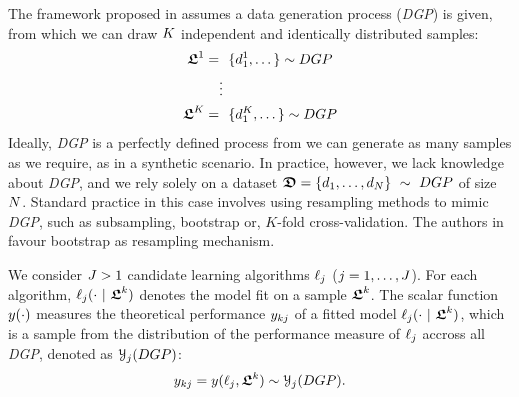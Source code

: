 The framework proposed in \citet{Hothorn2005DABenchExp} assumes
a data generation process (\emph{DGP}) is given,
from which we can draw $K$ independent and identically distributed
samples:
%
\begin{align}
  \begin{split}
    \boldsymbol{\mathfrak{L}}^1 =&{}~\ \{d_1^1, \dots\}
      \sim DGP \\
    &{}\vdots \\
    \boldsymbol{\mathfrak{L}}^{K} =&{}~\ \{d_1^{K},\dots\} 
      \sim DGP
\end{split}
\end{align}
%
Ideally, \emph{DGP} is a perfectly defined process from we can generate
as many samples as we require, as in a synthetic scenario.
%
In practice, however, we lack knowledge about \emph{DGP},
and we rely solely on a dataset 
$\boldsymbol{\mathfrak{D}} = \{d_1,\dots, d_{N}\}~\sim~DGP$
of size $N$.
%
Standard practice in this case involves using resampling methods 
to mimic \emph{DGP}, such as subsampling, bootstrap or, 
$K$-fold cross-validation.
%
The authors in \citet{Hothorn2005DABenchExp, EugsterPhD} favour
bootstrap as resampling mechanism.


We consider $J > 1$ candidate learning algorithms  
$\ell_{j}$ ($j = 1, \dots, J$).
%
For each algorithm, $\ell_{j} (\cdot~|~\boldsymbol{\mathfrak{L}}^{k})$ 
denotes the model fit on a sample $\boldsymbol{\mathfrak{L}}^{k}$.
%
%
The scalar function $y(\cdot)$ measures the theoretical performance
$y_{kj}$ of a fitted model $\ell_{j} (\cdot~|~\boldsymbol{\mathfrak{L}}^{k})$,
which is a sample from the distribution of the performance measure
of $\ell_j$ accross all \emph{DGP}, denoted as $\mathcal{Y}_j(DGP)$:
%
\begin{align}
  y_{kj} = 
  y(\ell_j,\boldsymbol{\mathfrak{L}}^{k}) \sim \mathcal{Y}_j(DGP).
\end{align}
%

